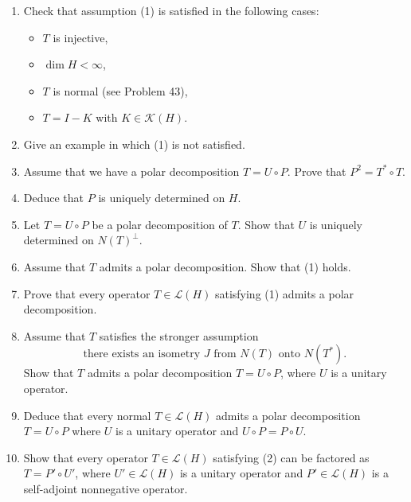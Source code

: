 \documentclass[12pt]{article}
\begin{document}
\begin{enumerate}
\item Check that assumption (1) is satisfied in the following cases:
\begin{itemize}
    \item[(i)] $T$ is injective,
    \item[(ii)] $\dim H < \infty$,
    \item[(iii)] $T$ is normal (see Problem 43),
    \item[(iv)] $T = I - K$ with $K \in \mathcal{K}(H)$.
\end{itemize}
 
\item Give an example in which (1) is not satisfied.
 
 
\item Assume that we have a polar decomposition $T = U \circ P$. Prove that $P^2 = T^* \circ T$.
 
\item Deduce that $P$ is uniquely determined on $H$.
 
 
\item Let $T = U \circ P$ be a polar decomposition of $T$. Show that $U$ is uniquely
determined on $N(T)^\perp$.
 
\item Assume that $T$ admits a polar decomposition. Show that (1) holds.
 
\noindent[\textit{Hint:} Set $J = U|_{N(T)}$.]
 
\item Prove that every operator $T \in \mathcal{L}(H)$ satisfying (1) admits a polar decomposition.
 
\item Assume that $T$ satisfies the stronger assumption
\begin{equation}\tag{2}
\text{there exists an isometry } J \text{ from } N(T) \text{ onto } N(T^*).
\end{equation}
Show that $T$ admits a polar decomposition $T = U \circ P$, where $U$ is a unitary
operator.
 
\item Deduce that every normal $T \in \mathcal{L}(H)$ admits a polar decomposition $T = U \circ P$
where $U$ is a unitary operator and $U \circ P = P \circ U$.
 
\item Show that every operator $T \in \mathcal{L}(H)$ satisfying (2) can be factored as
$T = P' \circ U'$, where $U' \in \mathcal{L}(H)$ is a unitary operator and $P' \in \mathcal{L}(H)$
is a self-adjoint nonnegative operator.
 

\end{enumerate}
\end{document}

